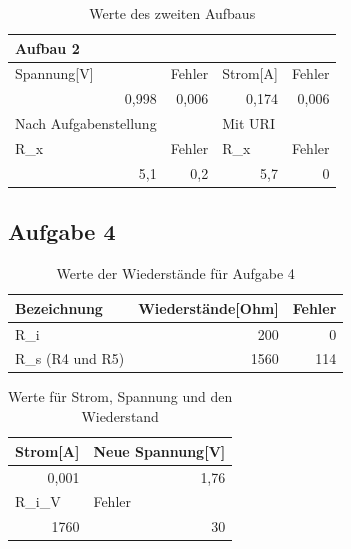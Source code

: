 \documentclass[12pt]{scrartcl}
\begin{document}
\begin{table}[htbp]
\caption{Werte des zweiten Aufbaus}
\begin{tabular}{|l|l|l|l|}
\hline
Aufbau 2 &  &  &  \\ \hline
Spannung[V] & Fehler & Strom[A] & Fehler \\ \hline
\multicolumn{1}{|r|}{0,998} & \multicolumn{1}{r|}{0,006} & \multicolumn{1}{r|}{0,174} & \multicolumn{1}{r|}{0,006} \\ \hline
Nach Aufgabenstellung &  & Mit URI &  \\ \hline
R\_x & Fehler & R\_x & Fehler \\ \hline
\multicolumn{1}{|r|}{5,1} & \multicolumn{1}{r|}{0,2} & \multicolumn{1}{r|}{5,7} & \multicolumn{1}{r|}{0} \\ \hline
\end{tabular}
\label{aufgabe_3_aufbau_2}
\end{table}

\newpage

\subsection{Aufgabe 4}

\begin{table}[htbp]
\caption{Werte der Wiederstände für Aufgabe 4}
\begin{tabular}{|l|r|r|}
\hline
Bezeichnung & \multicolumn{1}{l|}{Wiederstände[Ohm]} & \multicolumn{1}{l|}{Fehler} \\ \hline
R\_i & 200 & 0 \\ \hline
R\_s (R4 und R5) & 1560 & 114 \\ \hline
\end{tabular}
\label{aufgabe_4_wiederstände}
\end{table}

\begin{table}[htbp]
\caption{Werte für Strom, Spannung und den Wiederstand}
\begin{tabular}{|l|l|}
\hline
Strom[A] & Neue Spannung[V] \\ \hline
\multicolumn{1}{|r|}{0,001} & \multicolumn{1}{r|}{1,76} \\ \hline
R\_i\_V & Fehler \\ \hline
\multicolumn{1}{|r|}{1760} & \multicolumn{1}{r|}{30} \\ \hline
\end{tabular}
\label{aufgabe_4_werte}
\end{table}
\end{document}
